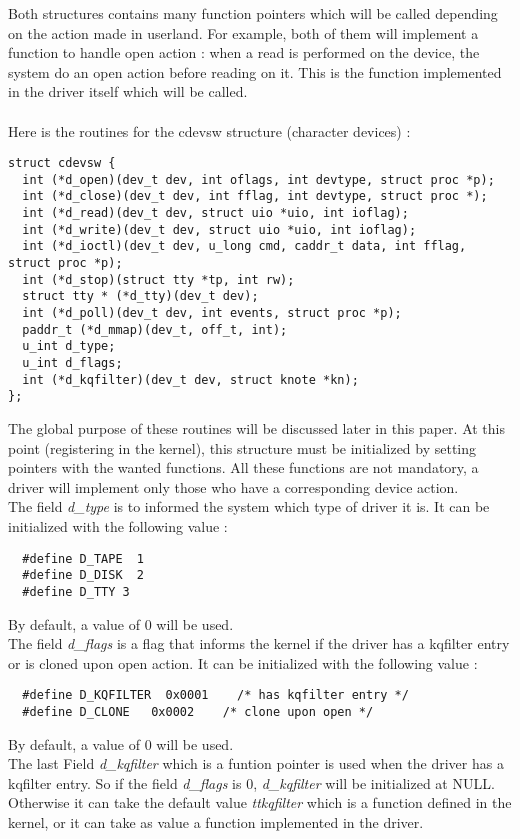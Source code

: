 \documentclass[11pt]{report}
\begin{document}
Both structures contains many function pointers which will be called depending on the
action made in userland. For example, both of them will implement a function
to handle open action : when a read is performed on the device, the system
do an open action before reading on it. This is the function implemented in
the driver itself which will be called.\\\\
Here is the routines for the cdevsw structure (character devices) :
\begin{lstlisting}
struct cdevsw {
  int (*d_open)(dev_t dev, int oflags, int devtype, struct proc *p);
  int (*d_close)(dev_t dev, int fflag, int devtype, struct proc *);
  int (*d_read)(dev_t dev, struct uio *uio, int ioflag);
  int (*d_write)(dev_t dev, struct uio *uio, int ioflag);
  int (*d_ioctl)(dev_t dev, u_long cmd, caddr_t data, int fflag, struct proc *p);
  int (*d_stop)(struct tty *tp, int rw);
  struct tty * (*d_tty)(dev_t dev);
  int (*d_poll)(dev_t dev, int events, struct proc *p);
  paddr_t (*d_mmap)(dev_t, off_t, int);
  u_int d_type;
  u_int d_flags;
  int (*d_kqfilter)(dev_t dev, struct knote *kn);
};
\end{lstlisting}
The global purpose of these routines will be discussed later in this paper. At this
point (registering in the kernel), this structure must be initialized by setting
pointers with the wanted functions. All these functions are not mandatory, a
driver will implement only those who have a corresponding device action.\\

The field {\it d\_type} is to informed the system which type of driver it is.
It can be initialized with the following value :
\begin{lstlisting}
  #define D_TAPE  1
  #define D_DISK  2
  #define D_TTY 3
\end{lstlisting}
By default, a value of 0 will be used.\\

The field {\it d\_flags} is a flag that informs the kernel if the driver has a
kqfilter entry or is cloned upon open action.
It can be initialized with the following value :
\begin{lstlisting}
  #define D_KQFILTER  0x0001    /* has kqfilter entry */
  #define D_CLONE   0x0002    /* clone upon open */
\end{lstlisting}
By default, a value of 0 will be used.\\

The last Field {\it d\_kqfilter} which is a funtion pointer is used when the driver
has a kqfilter entry. So if the field {\it d\_flags} is 0, {\it d\_kqfilter} will be
initialized at NULL. Otherwise it can take the default value {\it ttkqfilter} which
is a function defined in the kernel, or it can take as value a function implemented in
the driver.\\
\end{document}
